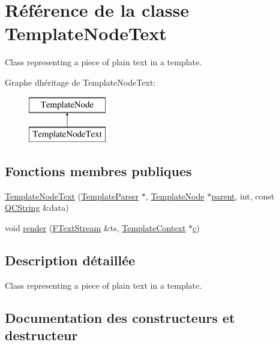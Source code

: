 \hypertarget{class_template_node_text}{}\section{Référence de la classe Template\+Node\+Text}
\label{class_template_node_text}


Class representing a piece of plain text in a template.  


Graphe d\textquotesingle{}héritage de Template\+Node\+Text\+:\begin{figure}[H]
\begin{center}
\leavevmode
\includegraphics[height=2.000000cm]{class_template_node_text}
\end{center}
\end{figure}
\subsection*{Fonctions membres publiques}
\begin{DoxyCompactItemize}
\item 
\hyperlink{class_template_node_text_abfbbb434e79f70fc795a006b237c8833}{Template\+Node\+Text} (\hyperlink{class_template_parser}{Template\+Parser} $\ast$, \hyperlink{class_template_node}{Template\+Node} $\ast$\hyperlink{class_template_node_a69a306ef84e62af9fe57bf9aacc94536}{parent}, int, const \hyperlink{class_q_c_string}{Q\+C\+String} \&data)
\item 
void \hyperlink{class_template_node_text_a738c829676cc813d7d66d4f0f3537d3f}{render} (\hyperlink{class_f_text_stream}{F\+Text\+Stream} \&ts, \hyperlink{class_template_context}{Template\+Context} $\ast$\hyperlink{060__command__switch_8tcl_ab14f56bc3bd7680490ece4ad7815465f}{c})
\end{DoxyCompactItemize}


\subsection{Description détaillée}
Class representing a piece of plain text in a template. 

\subsection{Documentation des constructeurs et destructeur}
\hypertarget{class_template_node_text_abfbbb434e79f70fc795a006b237c8833}{}
